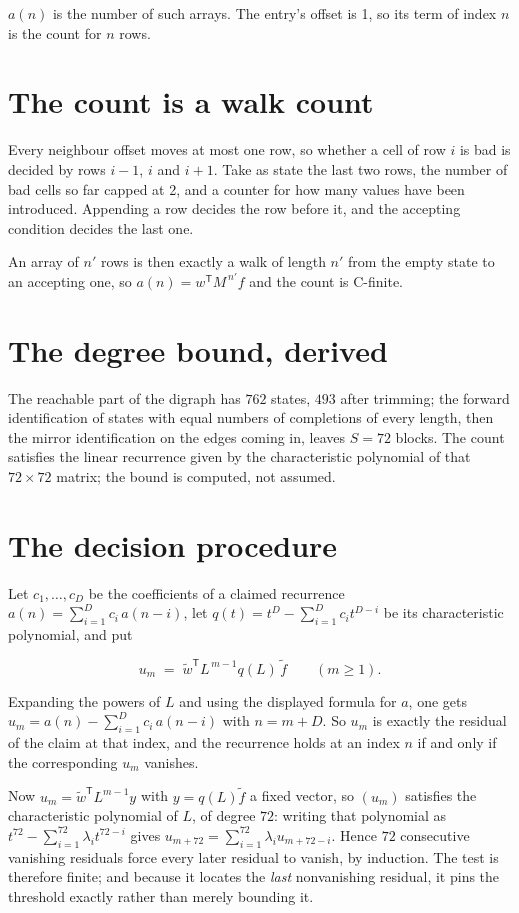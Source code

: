 \documentclass[11pt]{article}
\theoremstyle{definition}
\begin{document}
$a(n)$ is the number of such arrays. The entry's offset is 1, so its term of index $n$ is the count for $n$ rows.

\section{The count is a walk count}

Every neighbour offset moves at most one row, so whether a cell of row $i$ is bad is decided by rows $i-1$, $i$ and $i+1$. Take as state the last two rows, the number of bad cells so far capped at 2, and a counter for how many values have been introduced. Appending a row decides the row before it, and the accepting condition decides the last one.

An array of $n'$ rows is then exactly a walk of length $n'$ from the empty state to an accepting one, so $a(n) = w^{\mathsf T}M^{\,n'}f$ and the count is C-finite.

\section{The degree bound, derived}

The reachable part of the digraph has $762$ states, $493$ after trimming; the forward identification of states with equal numbers of completions of every length, then the mirror identification on the edges coming in, leaves $S = 72$ blocks. The count satisfies the linear recurrence given by the characteristic polynomial of that $72\times72$ matrix; the bound is computed, not assumed.

\section{The decision procedure}

Let $c_1,\dots,c_D$ be the coefficients of a claimed recurrence $a(n) = \sum_{i=1}^{D} c_i\,a(n-i)$, let $q(t) = t^{D} - \sum_{i=1}^{D} c_i t^{D-i}$ be its characteristic polynomial, and put

\[u_m \;=\; \tilde w^{\mathsf T} L^{\,m-1} q(L)\,\tilde f \qquad (m \ge 1).\]

Expanding the powers of $L$ and using the displayed formula for $a$, one gets $u_m = a(n) - \sum_{i=1}^{D} c_i\,a(n-i)$ with $n = m + D$. So $u_m$ is exactly the residual of the claim at that index, and the recurrence holds at an index $n$ if and only if the corresponding $u_m$ vanishes.

Now $u_m = \tilde w^{\mathsf T} L^{m-1} y$ with $y = q(L)\tilde f$ a fixed vector, so $(u_m)$ satisfies the characteristic polynomial of $L$, of degree $72$: writing that polynomial as $t^{72} - \sum_{i=1}^{72} \lambda_i t^{72-i}$ gives $u_{m+72} = \sum_{i=1}^{72} \lambda_i u_{m+72-i}$. Hence $72$ consecutive vanishing residuals force every later residual to vanish, by induction. The test is therefore finite; and because it locates the {\itshape last} nonvanishing residual, it pins the threshold exactly rather than merely bounding it.
\end{document}
